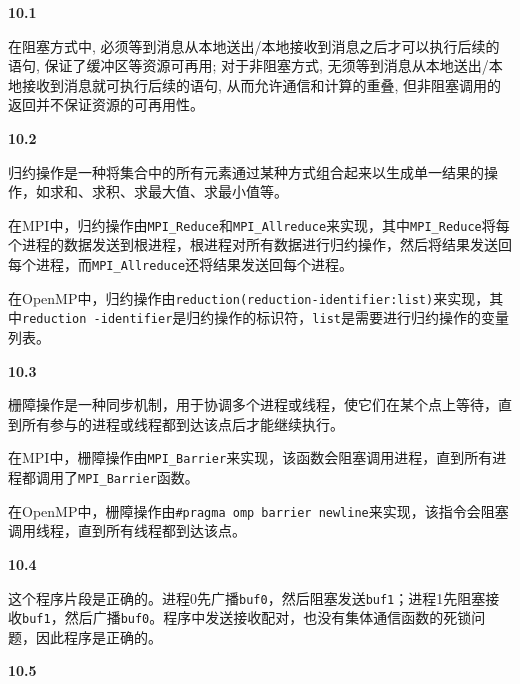 \documentclass[UTF8]{report}
\begin{document}
\pagestyle{fancy}

\maketitle

\noindent
\textbf{10.1}

在阻塞方式中, 必须等到消息从本地送出/本地接收到消息之后才可以执行后续的语句, 保证了缓冲区等资源可再用; 对于非阻塞方式, 无须等到消息从本地送出/本地接收到消息就可执行后续的语句, 从而允许通信和计算的重叠, 但非阻塞调用的返回并不保证资源的可再用性。

\noindent
\textbf{10.2}

归约操作是一种将集合中的所有元素通过某种方式组合起来以生成单一结果的操作，如求和、求积、求最大值、求最小值等。

在MPI中，归约操作由\texttt{MPI\_Reduce}和\texttt{MPI\_Allreduce}来实现，其中\texttt{MPI\_Reduce}将每个进程的数据发送到根进程，根进程对所有数据进行归约操作，然后将结果发送回每个进程，而\texttt{MPI\_Allreduce}还将结果发送回每个进程。

在OpenMP中，归约操作由\texttt{reduction(reduction-identifier:list)}来实现，其中\texttt{reduction -identifier}是归约操作的标识符，\texttt{list}是需要进行归约操作的变量列表。

\noindent
\textbf{10.3}

栅障操作是一种同步机制，用于协调多个进程或线程，使它们在某个点上等待，直到所有参与的进程或线程都到达该点后才能继续执行。

在MPI中，栅障操作由\texttt{MPI\_Barrier}来实现，该函数会阻塞调用进程，直到所有进程都调用了\texttt{MPI\_Barrier}函数。

在OpenMP中，栅障操作由\texttt{\#pragma omp barrier newline}来实现，该指令会阻塞调用线程，直到所有线程都到达该点。

\noindent
\textbf{10.4}

这个程序片段是正确的。进程0先广播\texttt{buf0}，然后阻塞发送\texttt{buf1}；进程1先阻塞接收\texttt{buf1}，然后广播\texttt{buf0}。程序中发送接收配对，也没有集体通信函数的死锁问题，因此程序是正确的。

\noindent
\textbf{10.5}
\end{document}
